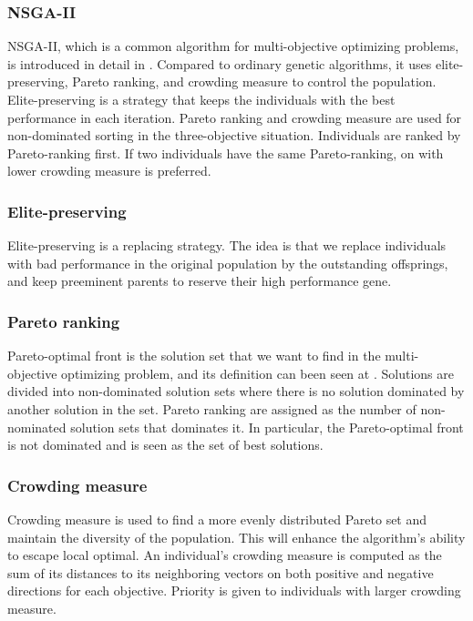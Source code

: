 \documentclass[conference]{IEEEtran}
\begin{document}
	 
	 \subsubsection{NSGA-II}
	 
   NSGA-II, which is a common algorithm for multi-objective optimizing problems, is introduced in detail in \cite{996017}. Compared to ordinary genetic algorithms, it uses elite-preserving, Pareto ranking, and crowding measure to control the population. Elite-preserving is a strategy that keeps the individuals with the best performance in each iteration. Pareto ranking and crowding measure are used for non-dominated sorting in the three-objective situation. Individuals are ranked by Pareto-ranking first. If two individuals have the same Pareto-ranking, on with lower crowding measure is preferred.
   
	 \subsubsection{Elite-preserving}
	 
	 Elite-preserving is a replacing strategy. The idea is that we replace individuals with bad performance in the original population by the outstanding offsprings, and keep preeminent parents to reserve their high performance gene. 
	 
	 \subsubsection{Pareto ranking}
	 
   Pareto-optimal front is the solution set that we want to find in the multi-objective optimizing problem, and its definition can been seen at \cite{ishibuchi2007analysis}. Solutions are divided into  non-dominated solution sets where there is no solution dominated by another solution in the set. Pareto ranking are assigned as the number of non-nominated solution sets that dominates it. In particular, the Pareto-optimal front is not dominated and is seen as the set of best solutions.
	 
	 \subsubsection{Crowding measure}
	 
	 Crowding measure is used to find a more evenly distributed Pareto set and maintain the diversity of the population. This will enhance the algorithm's ability to escape local optimal. An individual's crowding measure is computed as the sum of its distances to its neighboring vectors on both positive and negative directions for each objective. Priority is given to individuals with larger crowding measure.
	 
\end{document}
